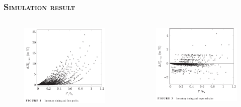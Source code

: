 \documentclass[aspectratio=169]{../presentation}
\begin{document}
    \begin{frame}
        \frametitle{\textsc{Simulation result}}

        \begin{columns}
            \begin{column}{0.45\linewidth}
                \begin{figure}[ht]
                    \includegraphics[width=\linewidth]{imgs/gp01-3.png}
                \end{figure}
            \end{column}
            \begin{column}{0.45\linewidth}
                \begin{figure}[ht]
                    \includegraphics[width=\linewidth]{imgs/gp01-4.png}
                \end{figure}
            \end{column}
        \end{columns}

    \end{frame}
\end{document}

